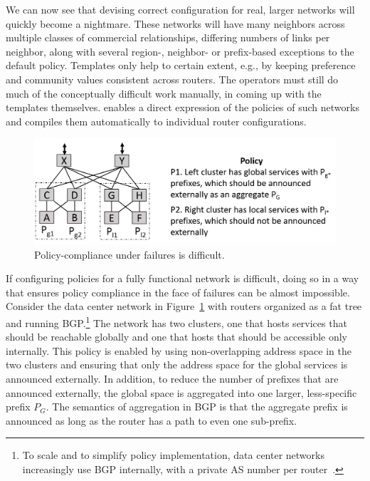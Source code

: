 We can now see that devising correct configuration for real, larger networks will quickly become a nightmare. These networks will have many neighbors across multiple classes of commercial relationships, differing numbers of links per neighbor, along with several region-, neighbor- or prefix-based exceptions to the default policy. Templates only help to certain extent, e.g., by keeping preference and community values consistent across routers. The operators must still do much of the conceptually difficult work manually, in coming up with the templates themselves. \sysname enables a direct expression of the policies of such networks and compiles them automatically to individual router configurations.

\begin{figure}[t!]
\centering
\includegraphics[width=\columnwidth]{figures/example2}
\caption{Policy-compliance under failures is difficult.}
\label{fig:example2}
\end{figure}

If configuring policies for a fully functional network is difficult, doing so in a way that ensures policy compliance in the face of failures can be almost impossible. Consider the data center network in Figure~\ref{fig:example2} with routers organized as a fat tree and running BGP.\footnote{To scale and to simplify policy implementation, data center networks increasingly use BGP internally, with a private AS number per router~\cite{bgp-in-dc-rfc}.} The network has two clusters, one that hosts services that should be reachable globally and one that hosts that should be accessible only internally. This policy is enabled by using non-overlapping address space in the two clusters and ensuring that only the address space for the global services is announced externally. In addition, to reduce the number of prefixes that are announced externally, the global space is aggregated into one larger, less-specific prefix $P_G$. The semantics of aggregation in BGP is that the aggregate prefix is announced as long as the router has a path to even one sub-prefix.

